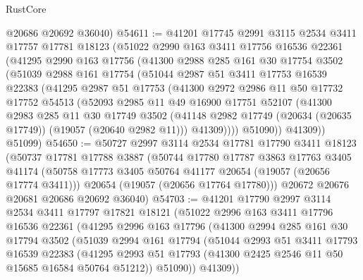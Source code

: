 \begin{lexlean}{RustCore}
\begin{coremodule}
      @20686
      @20692
      @36040)
@54611 := @41201
    @17745
    @2991
    @3115
    @2534
    @3411
    @17757
    @17781
    @18123
    (@51022
      @2990
      @163
      @3411
      @17756
      @16536
      @22361
      (@41295
        @2990
        @163
        @17756
        (@41300
          @2988
          @285
          @161
          @30
          @17754
          @3502
          (@51039
            @2988
            @161
            @17754
            (@51044
              @2987
              @51
              @3411
              @17753
              @16539
              @22383
              (@41295
                @2987
                @51
                @17753
                (@41300
                  @2972
                  @2986
                  @11
                  @50
                  @17732
                  @17752
                  @54513
                  (@52093
                    @2985
                    @11
                    @49
                    @16900
                    @17751
                    @52107
                    (@41300
                      @2983
                      @285
                      @11
                      @30
                      @17749
                      @3502
                      (@41148 @2982 @17749 (@20634 (@20635 @17749)) (@19057 (@20640 @2982 @11)))
                      @41309))))
              @51090))
          @41309))
      @51099)
@54650 := @50727
    @2997
    @3114
    @2534
    @17781
    @17790
    @3411
    @18123
    (@50737
      @17781
      @17788
      @3887
      (@50744
        @17780
        @17787
        @3863
        @17763
        @3405
        @41174
        (@50758 @17773 @3405 @50764 @41177 @20654 (@19057 (@20656 @17774 @3411)))
        @20654
        (@19057 (@20656 @17764 @17780)))
      @20672
      @20676
      @20681
      @20686
      @20692
      @36040)
@54703 := @41201
    @17790
    @2997
    @3114
    @2534
    @3411
    @17797
    @17821
    @18121
    (@51022
      @2996
      @163
      @3411
      @17796
      @16536
      @22361
      (@41295
        @2996
        @163
        @17796
        (@41300
          @2994
          @285
          @161
          @30
          @17794
          @3502
          (@51039
            @2994
            @161
            @17794
            (@51044
              @2993
              @51
              @3411
              @17793
              @16539
              @22383
              (@41295 @2993 @51 @17793 (@41300 @2425 @2546 @11 @50 @15685 @16584 @50764 @51212))
              @51090))
          @41309))

\end{coremodule}
\end{lexlean}

